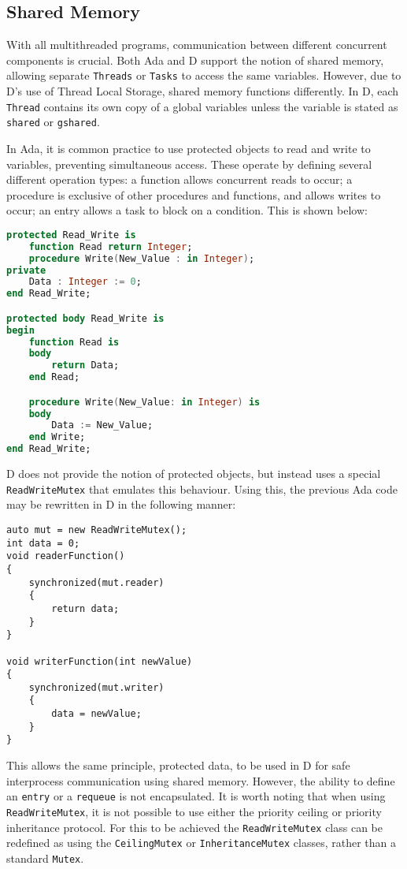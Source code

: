 \subsection{Shared Memory}
With all multithreaded programs, communication between different concurrent
components is crucial. Both Ada and D support the notion of shared memory,
allowing separate \texttt{Threads} or \texttt{Tasks} to access the same
variables. However, due to D's use of Thread Local Storage, shared memory functions
differently. In D, each \texttt{Thread} contains its own copy of a global 
variables unless the variable is stated 
as \texttt{shared} or \texttt{\textunderscore{}\textunderscore{}gshared}. 
\par\bigskip\noindent
In Ada, it is common practice to use protected objects to read and write to
variables, preventing simultaneous access. These operate by defining several different 
operation types: a function allows concurrent reads to occur; a procedure
is exclusive of other procedures and functions, and allows writes to occur; 
an entry allows a task to block on a condition. This is shown
below: 
\begin{lstlisting}[basicstyle=\small,language=Ada]
protected Read_Write is
    function Read return Integer;
    procedure Write(New_Value : in Integer); 
private 
    Data : Integer := 0; 
end Read_Write;

protected body Read_Write is 
begin 
    function Read is 
    body 
        return Data; 
    end Read; 

    procedure Write(New_Value: in Integer) is 
    body
        Data := New_Value; 
    end Write; 
end Read_Write; 
\end{lstlisting}
D does not provide the notion of protected objects, but instead uses a
special \texttt{ReadWriteMutex} that emulates this behaviour.
Using this, the previous Ada code may be rewritten in D
in the following manner: 
\begin{lstlisting}[basicstyle=\small]
auto mut = new ReadWriteMutex(); 
int data = 0; 
void readerFunction()
{
    synchronized(mut.reader)
    {
        return data; 
    }
}

void writerFunction(int newValue)
{
    synchronized(mut.writer)
    {
        data = newValue;
    }
}
\end{lstlisting}
This allows the same principle, protected data, to be used in D for
safe interprocess communication using shared memory. However, the ability to 
define an \texttt{entry} or a \texttt{requeue} is not encapsulated. 
It is worth noting that when using \texttt{ReadWriteMutex}, it is not possible to 
use either the priority ceiling or priority inheritance protocol.
For this to be achieved the \texttt{ReadWriteMutex} class
can be redefined as using the \texttt{CeilingMutex} or
\texttt{InheritanceMutex} classes, rather than a standard \texttt{Mutex}. 

